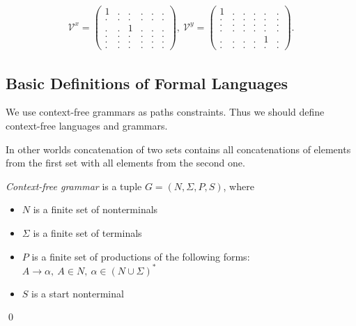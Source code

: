 \begin{align*}
\mathcal{V}^x =
\begin{pmatrix}
    1 & . & . & . & . & . \\
    . & . & . & . & . & . \\
    . & . & 1 & . & . & . \\
    . & . & . & . & . & . \\ 
    . & . & . & . & . & . \\ 
    . & . & . & . & . & .
\end{pmatrix},~ 
\mathcal{V}^y =
\begin{pmatrix}
    1 & . & . & . & . & . \\
    . & . & . & . & . & . \\
    . & . & . & . & . & . \\
    . & . & . & . & . & . \\ 
    . & . & . & . & 1 & . \\ 
    . & . & . & . & . & .
\end{pmatrix}.
\end{align*}


\subsection{Basic Definitions of Formal Languages}
We use context-free grammars as paths constraints. Thus we should define context-free languages and grammars.



In other worlds concatenation of two sets contains all concatenations of elements from the first set with all elements from the second one.

\begin{definition}\emph{Context-free grammar} is a tuple $G=(N, \Sigma, P, S)$, where 
\begin{itemize}
    \item $N$ is a finite set of nonterminals
    \item $\Sigma$ is a finite set of terminals
    \item $P$ is a finite set of productions of the following forms: $A \to \alpha, ~A \in N,~ \alpha \in (N \cup \Sigma)^*$
    \item $S$ is a start nonterminal
\end{itemize} \qed
\end{definition}


